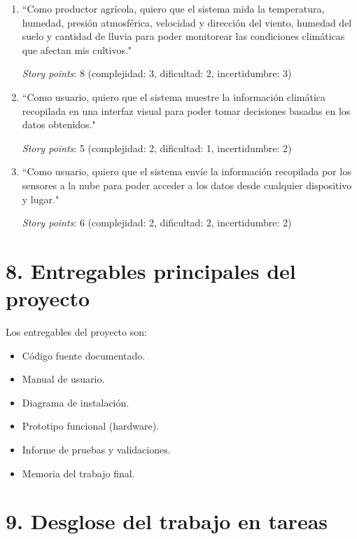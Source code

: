\documentclass[
11pt, %
codirector, %
]{charter}
\begin{document}
\begin{enumerate}

\item ``Como productor agrícola, quiero que el sistema mida la temperatura, humedad, presión atmosférica, velocidad y dirección del viento, humedad del suelo y cantidad de lluvia para poder monitorear las condiciones climáticas que afectan mis cultivos."

\textit{Story points}: 8 (complejidad: 3, dificultad: 2, incertidumbre: 3)

\item ``Como usuario, quiero que el sistema muestre la información climática recopilada en una interfaz visual para poder tomar decisiones basadas en los datos obtenidos."

\textit{Story points}: 5 (complejidad: 2, dificultad: 1, incertidumbre: 2)

\item ``Como usuario, quiero que el sistema envíe la información recopilada por los sensores a la nube para poder acceder a los datos desde cualquier dispositivo y lugar."

\textit{Story points}: 6 (complejidad: 2, dificultad: 2, incertidumbre: 2)

\end{enumerate}

\section{8. Entregables principales del proyecto}
\label{sec:entregables}

Los entregables del proyecto son:

\begin{itemize}
	\item Código fuente documentado.
	\item Manual de usuario.
	\item Diagrama de instalación.
	\item Prototipo funcional (hardware).
	\item Informe de pruebas y validaciones.
	\item Memoria del trabajo final.
\end{itemize}

\section{9. Desglose del trabajo en tareas}
\label{sec:wbs}
\end{document}
